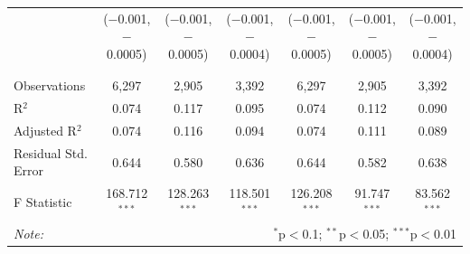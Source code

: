 \documentclass[alpha-refs]{wiley-article-01g}
\begin{document}
\begin{landscape}
\begin{table}[!htbp]
\begin{tabular}{@{\extracolsep{5pt}}lcccccc}
			& ($-$0.001, $-$0.0005) & ($-$0.001, $-$0.0005) & ($-$0.001, $-$0.0004) & ($-$0.001, $-$0.0005) & ($-$0.001, $-$0.0005) & ($-$0.001, $-$0.0004) \\ 
			& & & & & & \\ 
			\hline \\[-.8ex] 
			Observations & 6,297 & 2,905 & 3,392 & 6,297 & 2,905 & 3,392 \\ 
			R$^{2}$ & 0.074 & 0.117 & 0.095 & 0.074 & 0.112 & 0.090 \\ 
			Adjusted R$^{2}$ & 0.074 & 0.116 & 0.094 & 0.074 & 0.111 & 0.089 \\ 
			Residual Std. Error & 0.644 & 0.580 & 0.636 & 0.644 & 0.582 & 0.638 \\ 
			F Statistic & 168.712$^{***}$ & 128.263$^{***}$ & 118.501$^{***}$ & 126.208$^{***}$ & 91.747$^{***}$ & 83.562$^{***}$ \\ 
			\hline 
			\textit{Note:}  & \multicolumn{6}{r}{$^{*}$p$<$0.1; $^{**}$p$<$0.05; $^{***}$p$<$0.01} \\ 
		\end{tabular} 
	\end{table} 
	
\end{landscape}

\newpage
\end{document}
